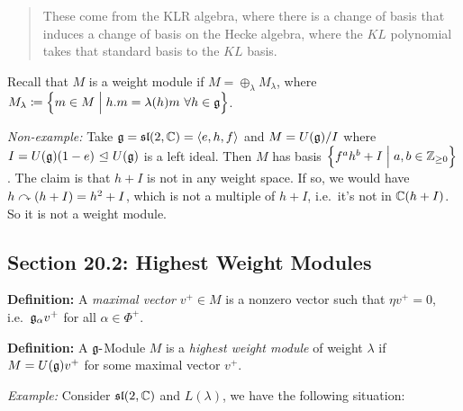 \begin{quote}
These come from the KLR algebra, where there is a change of basis that
induces a change of basis on the Hecke algebra, where the \(KL\)
polynomial takes that standard basis to the \(KL\) basis.
\end{quote}

Recall that \(M\) is a weight module if
\(M = \oplus_\lambda M_\lambda\), where
\(M_\lambda \coloneqq \left\{{m\in M \mathrel{\Big|} h.m = \lambda(h)m ~\forall h\in{\mathfrak{g}}}\right\}\).

\emph{Non-example:} Take
\({\mathfrak{g}} = {\mathfrak{sl}}(2, {\mathbb{C}}) = \left\langle{e, h, f}\right\rangle\) and
\(M = U({\mathfrak{g}})/ I\) where \(I = U({\mathfrak{g}}) (1-e) {~\trianglelefteq~} U({\mathfrak{g}})\) is a
left ideal. Then \(M\) has basis
\(\left\{{f^a h^b + I \mathrel{\Big|} a, b \in {\mathbb{Z}}_{\geq 0}}\right\}\). The claim is that
\(h + I\) is not in any weight space. If so, we would have
\(h \curvearrowright (h+I) = h^2 + I\), which is not a multiple of \(h +I\),
i.e.~it's not in \({\mathbb{C}}(h+I)\). So it is not a weight module.

\hypertarget{section-20.2-highest-weight-modules}{%
\subsection{Section 20.2: Highest Weight
Modules}\label{section-20.2-highest-weight-modules}}

\textbf{Definition:} A \emph{maximal vector} \(v^+ \in M\) is a nonzero
vector such that \(\eta v^+ = 0\), i.e.~\({\mathfrak{g}}_\alpha v^+\) for all
\(\alpha \in \Phi^+\).

\textbf{Definition:} A \({\mathfrak{g}}{\hbox{-}}\)Module \(M\) is a \emph{highest
weight module} of weight \(\lambda\) if \(M = U({\mathfrak{g}})v^+\) for some
maximal vector \(v^+\).

\emph{Example:} Consider \({\mathfrak{sl}}(2, {\mathbb{C}})\) and \(L(\lambda)\), we have
the following situation:

\begin{center}
\end{center}

